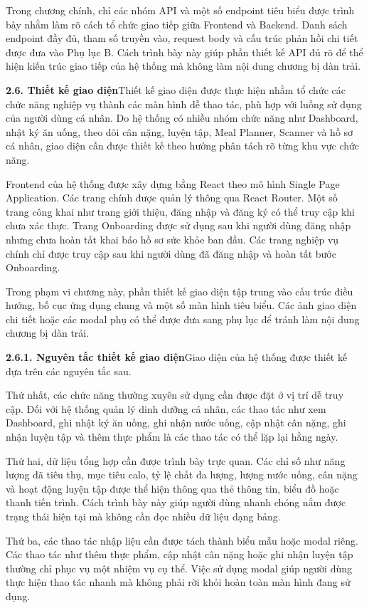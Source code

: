 Trong chương chính, chỉ các nhóm API và một số endpoint tiêu biểu được trình bày nhằm làm rõ cách tổ chức giao tiếp giữa Frontend và Backend. Danh sách endpoint đầy đủ, tham số truyền vào, request body và cấu trúc phản hồi chi tiết được đưa vào Phụ lục B. Cách trình bày này giúp phần thiết kế API đủ rõ để thể hiện kiến trúc giao tiếp của hệ thống mà không làm nội dung chương bị dàn trải.

\textbf{2.6. Thiết kế giao diện}Thiết kế giao diện được thực hiện nhằm tổ chức các chức năng nghiệp vụ thành các màn hình dễ thao tác, phù hợp với luồng sử dụng của người dùng cá nhân. Do hệ thống có nhiều nhóm chức năng như Dashboard, nhật ký ăn uống, theo dõi cân nặng, luyện tập, Meal Planner, Scanner và hồ sơ cá nhân, giao diện cần được thiết kế theo hướng phân tách rõ từng khu vực chức năng.

Frontend của hệ thống được xây dựng bằng React theo mô hình Single Page Application. Các trang chính được quản lý thông qua React Router. Một số trang công khai như trang giới thiệu, đăng nhập và đăng ký có thể truy cập khi chưa xác thực. Trang Onboarding được sử dụng sau khi người dùng đăng nhập nhưng chưa hoàn tất khai báo hồ sơ sức khỏe ban đầu. Các trang nghiệp vụ chính chỉ được truy cập sau khi người dùng đã đăng nhập và hoàn tất bước Onboarding.

Trong phạm vi chương này, phần thiết kế giao diện tập trung vào cấu trúc điều hướng, bố cục ứng dụng chung và một số màn hình tiêu biểu. Các ảnh giao diện chi tiết hoặc các modal phụ có thể được đưa sang phụ lục để tránh làm nội dung chương bị dàn trải.

\textbf{2.6.1. Nguyên tắc thiết kế giao diện}Giao diện của hệ thống được thiết kế dựa trên các nguyên tắc sau.

Thứ nhất, các chức năng thường xuyên sử dụng cần được đặt ở vị trí dễ truy cập. Đối với hệ thống quản lý dinh dưỡng cá nhân, các thao tác như xem Dashboard, ghi nhật ký ăn uống, ghi nhận nước uống, cập nhật cân nặng, ghi nhận luyện tập và thêm thực phẩm là các thao tác có thể lặp lại hằng ngày.

Thứ hai, dữ liệu tổng hợp cần được trình bày trực quan. Các chỉ số như năng lượng đã tiêu thụ, mục tiêu calo, tỷ lệ chất đa lượng, lượng nước uống, cân nặng và hoạt động luyện tập được thể hiện thông qua thẻ thông tin, biểu đồ hoặc thanh tiến trình. Cách trình bày này giúp người dùng nhanh chóng nắm được trạng thái hiện tại mà không cần đọc nhiều dữ liệu dạng bảng.

Thứ ba, các thao tác nhập liệu cần được tách thành biểu mẫu hoặc modal riêng. Các thao tác như thêm thực phẩm, cập nhật cân nặng hoặc ghi nhận luyện tập thường chỉ phục vụ một nhiệm vụ cụ thể. Việc sử dụng modal giúp người dùng thực hiện thao tác nhanh mà không phải rời khỏi hoàn toàn màn hình đang sử dụng.

